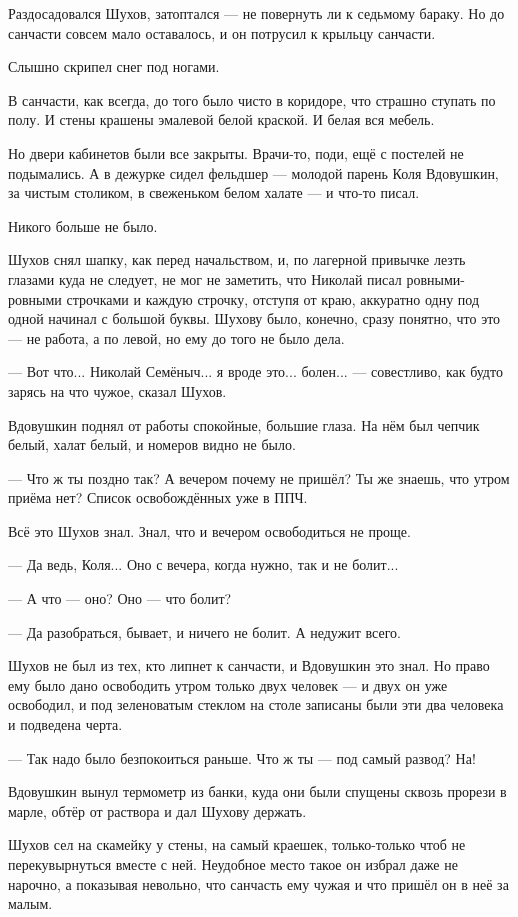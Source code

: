 Раздосадовался Шухов, затоптался --- не повернуть ли к седьмому бараку. Но до санчасти совсем
мало оставалось, и он потрусил к крыльцу санчасти.

Слышно скрипел снег под ногами.

В санчасти, как всегда, до того было чисто в коридоре, что страшно ступать по полу. И стены
крашены эмалевой белой краской. И белая вся мебель.

Но двери кабинетов были все закрыты. Врачи-то, поди, ещё с постелей не подымались. А в дежурке
сидел фельдшер --- молодой парень Коля Вдовушкин, за чистым столиком, в свеженьком белом
халате --- и что-то писал.

Никого больше не было.

Шухов снял шапку, как перед начальством, и, по лагерной привычке лезть глазами куда не
следует, не мог не заметить, что Николай писал ровными-ровными строчками и каждую строчку,
отступя от краю, аккуратно одну под одной начинал с большой буквы. Шухову было, конечно,
сразу понятно, что это --- не работа, а по левой, но ему до того не было дела.

--- Вот что... Николай Семёныч... я вроде это... болен... --- совестливо, как будто зарясь на что
чужое, сказал Шухов.

Вдовушкин поднял от работы спокойные, большие глаза. На нём был чепчик белый, халат белый, и
номеров видно не было.

--- Что ж ты поздно так? А вечером почему не пришёл? Ты же знаешь, что утром приёма нет? Список
освобождённых уже в ППЧ.

Всё это Шухов знал. Знал, что и вечером освободиться не проще.

--- Да ведь, Коля... Оно с вечера, когда нужно, так и не болит...

--- А что --- оно? Оно --- что болит?

--- Да разобраться, бывает, и ничего не болит. А недужит всего.

Шухов не был из тех, кто липнет к санчасти, и Вдовушкин это знал. Но право ему было дано
освободить утром только двух человек --- и двух он уже освободил, и под зеленоватым стеклом на
столе записаны были эти два человека и подведена черта.

--- Так надо было безпокоиться раньше. Что ж ты --- под самый развод? На!

Вдовушкин вынул термометр из банки, куда они были спущены сквозь прорези в марле, обтёр от
раствора и дал Шухову держать.

Шухов сел на скамейку у стены, на самый краешек, только-только чтоб не перекувырнуться
вместе с ней. Неудобное место такое он избрал даже не нарочно, а показывая невольно, что
санчасть ему чужая и что пришёл он в неё за малым.

